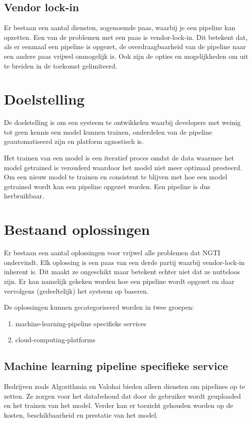 \subsection{Vendor lock-in}\label{sec:vendor-lock-in}
Er bestaan een aantal diensten, zogenoemde \acrfull{paas}, waarbij je een pipeline kan opzetten. Een van de problemen met een \acrshort{paas} is \gls{vendor-lock-in}. Dit betekent dat, als er eenmaal een pipeline is opgezet, de overdraagbaarheid van de pipeline naar een andere \acrshort{paas} vrijwel onmogelijk is. Ook zijn de opties en mogelijkheden om uit te breiden in de toekomst gelimiteerd.

\section{Doelstelling}\label{sec:doelstelling}
De doelstelling is om een systeem te ontwikkelen waarbij developers met weinig tot geen kennis een model kunnen trainen, onderdelen van de pipeline geautomatiseerd zijn en platform agnostisch is.

Het trainen van een model is een iteratief proces omdat de data waarmee het model getrained is verouderd waardoor het model niet meer optimaal presteerd. Om een nieuw model te trainen en consistent te blijven met hoe een model getrained wordt kan een pipeline opgezet worden. Een pipeline is dus herbruikbaar.

\section{Bestaand oplossingen}\label{sec:bestaande-oplossingen}
Er bestaan een aantal oplossingen voor vrijwel alle problemen dat NGTI ondervindt. Elk oplossing is een \acrshort{paas} van een derde partij waarbij \gls{vendor-lock-in} inherent is. Dit maakt ze ongeschikt maar betekent echter niet dat ze nutteloos zijn. Er kan namelijk gekeken worden hoe een pipeline wordt opgezet en daar vervolgens (gedeeltelijk) het systeem op baseren.

De oplossingen kunnen gecategoriseerd worden in twee groepen:
\begin{enumerate}
  \item \Gls{machine-learning-pipeline} specifieke services
  \item \Glspl{cloud-computing-platform}
\end{enumerate}

\subsection{Machine learning pipeline specifieke service}\label{subsec:machine-learning-pipeline-specifieke-service}
Bedrijven zoals Algorithmia \cite{algorithmia-website} en Valohai \cite{valohai-website} bieden alleen diensten om pipelines op te zetten. Ze zorgen voor het databehoud dat door de gebruiker wordt geuploaded en het trainen van het model. Verder kan er toezicht gehouden worden op de kosten, beschikbaarheid en prestatie van het model.

